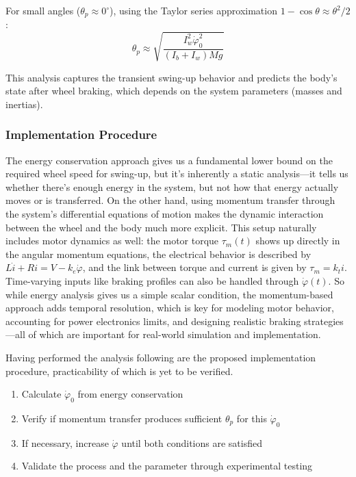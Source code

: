 \documentclass{article}
\begin{document}
For small angles ($\theta_{p} \approx 0^{\circ}$), using the Taylor series approximation $1 - \cos\theta \approx \theta^{2}/2$:
\begin{equation*}
\theta_{p} \approx \sqrt{\frac{I_{w}^{2}\dot{\varphi}_{0}^{2}}{(I_{b} + I_{w})Mg}}
\end{equation*}

This analysis captures the transient swing-up behavior and predicts the body's state after wheel braking, which depends on the system parameters (masses and inertias).

\subsubsection*{Implementation Procedure}

The energy conservation approach gives us a fundamental lower bound on the required wheel speed for swing-up, but it's inherently a static analysis—it tells us whether there's enough energy in the system, but not how that energy actually moves or is transferred. On the other hand, using momentum transfer through the system's differential equations of motion makes the dynamic interaction between the wheel and the body much more explicit. This setup naturally includes motor dynamics as well: the motor torque $\tau_m(t)$ shows up directly in the angular momentum equations, the electrical behavior is described by $L\dot{i} + Ri = V - k_e\dot{\varphi}$, and the link between torque and current is given by $\tau_m = k_t i$. Time-varying inputs like braking profiles can also be handled through $\dot{\varphi}(t)$. So while energy analysis gives us a simple scalar condition, the momentum-based approach adds temporal resolution, which is key for modeling motor behavior, accounting for power electronics limits, and designing realistic braking strategies—all of which are important for real-world simulation and implementation.

Having performed the analysis following are the proposed implementation procedure, practicability of which is yet to be verified.

\begin{enumerate}
  \item Calculate $\dot{\varphi}_{0}$ from energy conservation
  \item Verify if momentum transfer produces sufficient $\theta_{p}$ for this $\dot{\varphi}_{0}$
  \item If necessary, increase $\dot{\varphi}$ until both conditions are satisfied
  \item Validate the process and the parameter through experimental testing
\end{enumerate}
\end{document}

